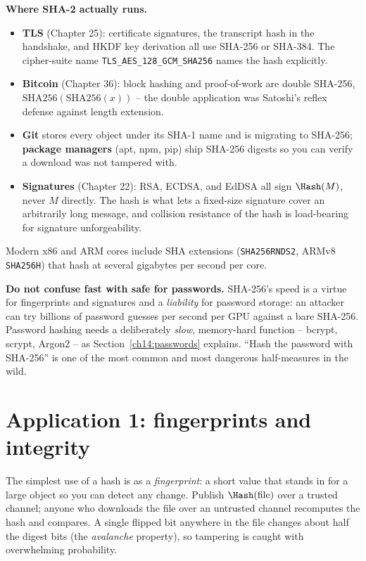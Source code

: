 \begin{applicationbox}
\textbf{Where SHA-2 actually runs.}
\begin{itemize}
  \item \textbf{TLS} (Chapter 25): certificate signatures, the transcript hash in the handshake, and HKDF key derivation all use SHA-256 or SHA-384. The cipher-suite name \texttt{TLS\_AES\_128\_GCM\_SHA256} names the hash explicitly.
  \item \textbf{Bitcoin} (Chapter 36): block hashing and proof-of-work are double SHA-256, $\text{SHA256}(\text{SHA256}(x))$ -- the double application was Satoshi's reflex defense against length extension.
  \item \textbf{Git} stores every object under its SHA-1 name and is migrating to SHA-256; \textbf{package managers} (apt, npm, pip) ship SHA-256 digests so you can verify a download was not tampered with.
  \item \textbf{Signatures} (Chapter 22): RSA, ECDSA, and EdDSA all sign $\Hash(M)$, never $M$ directly. The hash is what lets a fixed-size signature cover an arbitrarily long message, and collision resistance of the hash is load-bearing for signature unforgeability.
\end{itemize}
Modern x86 and ARM cores include SHA extensions (\texttt{SHA256RNDS2}, ARMv8 \texttt{SHA256H}) that hash at several gigabytes per second per core.
\end{applicationbox}

\begin{trapbox}
\textbf{Do not confuse fast with safe for passwords.} SHA-256's speed is a virtue for fingerprints and signatures and a \emph{liability} for password storage: an attacker can try billions of password guesses per second per GPU against a bare SHA-256. Password hashing needs a deliberately \emph{slow}, memory-hard function -- bcrypt, scrypt, Argon2 -- as Section~\ref{ch14:passwords} explains. ``Hash the password with SHA-256'' is one of the most common and most dangerous half-measures in the wild.
\end{trapbox}

\section{Application 1: fingerprints and integrity}
\label{ch14:fingerprints}

The simplest use of a hash is as a \emph{fingerprint}: a short value that stands in for a large object so you can detect any change. Publish $\Hash(\text{file})$ over a trusted channel; anyone who downloads the file over an untrusted channel recomputes the hash and compares. A single flipped bit anywhere in the file changes about half the digest bits (the \emph{avalanche} property), so tampering is caught with overwhelming probability.

